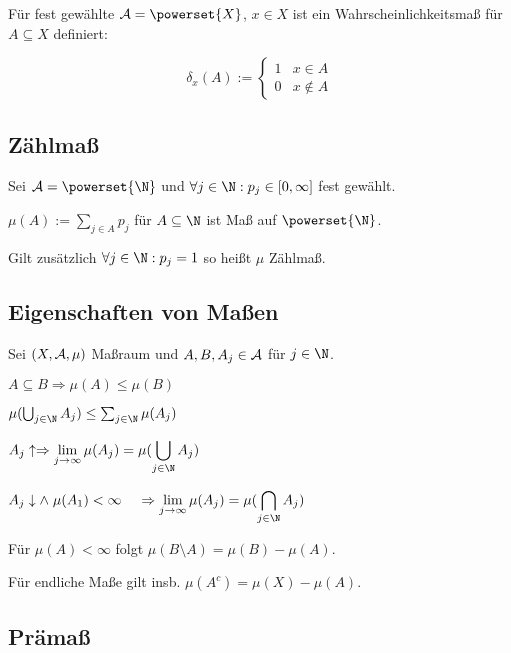 Für fest gewählte $\A = \powerset{X}$, $x \in X$ ist ein Wahrscheinlichkeitsmaß für $A \subseteq X$ definiert:

\vspace{-2mm}
\[ \delta_x(A) := \begin{cases}
	1 & x \in A \\
	0 & x \notin A
\end{cases} \]

\subsection*{Zählmaß}

Sei $\A = \powerset{\N}$ und $\forall j \in \N : p_j \in [0, \infty]$ fest gewählt.

$\mu(A) := \sum_{j\in A} p_j$ für $A \subseteq \N$ ist Maß auf $\powerset{\N}$.

Gilt zusätzlich $\forall j \in \N : p_j = 1$ so heißt $\mu$ Zählmaß.

\subsection*{Eigenschaften von Maßen}

Sei $(X, \mathcal{A}, \mu)$ Maßraum und $A, B, A_j \in \mathcal{A}$ für $j \in \N$.

\begin{description}[leftmargin=!,labelwidth=26mm]
	\item[Monotonie] $A \subseteq B \Rightarrow \mu(A) \leq \mu(B)$
	\item[$\sigma$-Subadditivität] $\mu(\bigcup_{j\in \N} A_j) \leq \sum_{j\in \N} \mu(A_j)$
	\item[Stetigkeit (unten)] $A_j \uparrow \Rightarrow \displaystyle\lim_{j\to \infty} \mu(A_j) = \mu(\bigcup_{j\in \N} A_j)$
	\item[Stetigkeit (oben)] $A_j \downarrow \land \hspace*{1mm} \mu(A_1) < \infty \\ \hspace*{4mm}\Rightarrow \displaystyle\lim_{j\to \infty} \mu(A_j) = \mu(\bigcap_{j\in \N} A_j)$
\end{description}

Für $\mu(A) < \infty$ folgt $\mu(B\setminus A) = \mu(B) - \mu(A)$.

Für endliche Maße gilt insb. $\mu(A^c) = \mu(X) - \mu(A)$.

\subsection*{Prämaß}

